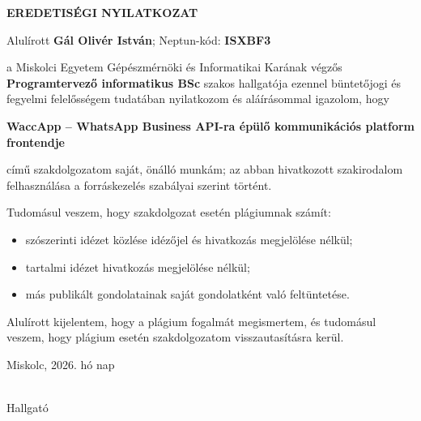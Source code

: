 \clearpage
\thispagestyle{empty}

\begin{center}
    \Large\textbf{EREDETISÉGI NYILATKOZAT}
\end{center}

\vspace{1.5cm}

\noindent
Alulírott \textbf{Gál Olivér István}; Neptun-kód: \textbf{ISXBF3}

\vspace{0.5cm}

\noindent
a Miskolci Egyetem Gépészmérnöki és Informatikai Karának végzős
\textbf{Programtervező informatikus BSc} szakos hallgatója ezennel
büntetőjogi és fegyelmi felelősségem tudatában nyilatkozom és
aláírásommal igazolom, hogy

\vspace{0.5cm}

\begin{center}
\textbf{WaccApp -- WhatsApp Business API-ra épülő kommunikációs platform frontendje}
\end{center}

\vspace{0.5cm}

\noindent
című szakdolgozatom saját, önálló munkám; az abban hivatkozott
szakirodalom felhasználása a forráskezelés szabályai szerint történt.

\vspace{0.5cm}

\noindent
Tudomásul veszem, hogy szakdolgozat esetén plágiumnak számít:

\begin{itemize}
    \item szószerinti idézet közlése idézőjel és hivatkozás megjelölése nélkül;
    \item tartalmi idézet hivatkozás megjelölése nélkül;
    \item más publikált gondolatainak saját gondolatként való feltüntetése.
\end{itemize}

\vspace{0.5cm}

\noindent
Alulírott kijelentem, hogy a plágium fogalmát megismertem, és
tudomásul veszem, hogy plágium esetén szakdolgozatom visszautasításra kerül.

\vfill

\noindent
Miskolc, 2026. \makebox[3cm]{\dotfill} hó \makebox[1.5cm]{\dotfill} nap

\vspace{2cm}

\begin{flushright}
\makebox[6cm]{\hrulefill}\\
Hallgató
\end{flushright}

\clearpage